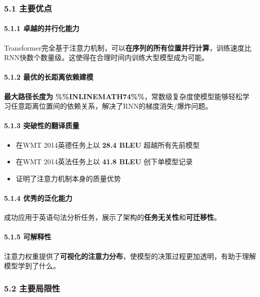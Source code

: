 \documentclass[11pt,a4paper]{article}
\begin{document}
\subsubsection*{5.1 主要优点}

\paragraph{5.1.1 卓越的并行化能力}

Transformer完全基于注意力机制，可以\textbf{在序列的所有位置并行计算}，训练速度比RNN快数个数量级。这使得在合理时间内训练大型模型成为可能。

\paragraph{5.1.2 最优的长距离依赖建模}

\textbf{最大路径长度为 \%\%INLINEMATH74\%\%}，常数级复杂度使模型能够轻松学习任意距离位置间的依赖关系，解决了RNN的梯度消失/爆炸问题。

\paragraph{5.1.3 突破性的翻译质量}

\begin{itemize}
  \item 在WMT 2014英德任务上以 \textbf{28.4 BLEU} 超越所有先前模型
  \item 在WMT 2014英法任务上以 \textbf{41.8 BLEU} 创下单模型记录
  \item 证明了注意力机制本身的质量优势
\end{itemize}

\paragraph{5.1.4 优秀的泛化能力}

成功应用于英语句法分析任务，展示了架构的\textbf{任务无关性}和\textbf{可迁移性}。

\paragraph{5.1.5 可解释性}

注意力权重提供了\textbf{可视化的注意力分布}，使模型的决策过程更加透明，有助于理解模型学到了什么。

\subsubsection*{5.2 主要局限性}
\end{document}
